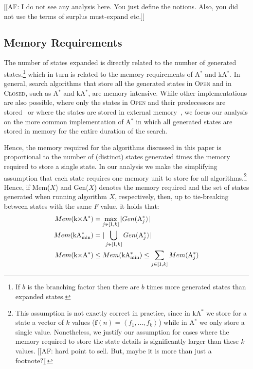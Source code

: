 \documentclass[twoside,11pt]{article}
\newcommand{\astar}{A$^*$\xspace}
\newcommand{\kastar}{kA$^*$\xspace}
\newcommand{\kastarvar}[1]{\textup{kA}$^*_{#1}$\xspace}
\newcommand{\kastarmin}{\kastarvar{\min}}
\newcommand{\kxastar}{k$\times$A$^*$\xspace}
\newcommand{\astari}[1]{A$^*_#1$\xspace}
\newcommand{\tuple}[1]{\ensuremath{\left \langle #1 \right \rangle }}
\newcommand{\open}{\textsc{Open}\xspace}
\newcommand{\closed}{\textsc{Closed}\xspace}
\newcommand{\vect}[1]{\mathbf{#1}}
\begin{document}
[[AF: I do not see any analysis here. You just define the notions. Also, you did not use the terms of surplus must-expand etc.]]



\subsection{Memory Requirements}
The number of states expanded is directly related to the number of generated states,\footnote{If $b$ is the branching factor then there are $b$ times more generated states than expanded states.} which in turn is related to the memory requirements of \astar and \kastar.
In general, search algorithms that store all the generated states in \open and in \closed, such as \astar and \kastar, are memory intensive.
While other implementations are also possible, where only the states in \open and their predecessors are stored~\cite{zhou2006breadth,korf2004best} or where the states are stored in external memory~\cite{zhou2004structured,edelkamp2016external,edelkamp2005external}, we focus our analysis on the more common implementation of \astar in which all generated states are stored in memory for the entire duration of the search.

Hence, the memory required for the algorithms discussed in this paper is proportional to the number of (distinct) states generated times the memory required to store a single state.
In our analysis we make the simplifying assumption that each state requires one memory unit to store for all algorithms.\footnote{This assumption is not exactly correct in practice, since in \kastar we store for a state a vector of $k$ values ($\vect{f}(n)=\tuple{f_1,\ldots,f_k}$) while in \astar we only store a single value.
Nonetheless, we justify our assumption for cases where the memory required to store the state details is significantly larger than these $k$ values.  [[AF: hard point to sell. But, maybe it is more than just a footnote?]]}
Hence, if Mem($X$) and Gen($X$) denotes the memory required and the set of states generated when running algorithm $X$, respectively, then, up to tie-breaking between states with the same $F$ value, it holds that:
\begin{align}
Mem(\text{\kxastar})&=\max_{j\in [1,k]}| Gen(\text{\astari{j}})| \label{eq:kxastar-mem}\\
Mem(\text{\kastarmin})&=|\bigcup_{j\in [1,k]} Gen(\text{\astari{j}})| \label{eq:kastar-mem}\\
Mem(\text{\kxastar})&\leq Mem(\text{\kastarmin}) \leq \sum_{j\in[1,k]} Mem(\text{\astari{j}}) \label{eq:kxastar-kastar-mem}
\end{align}
\end{document}
